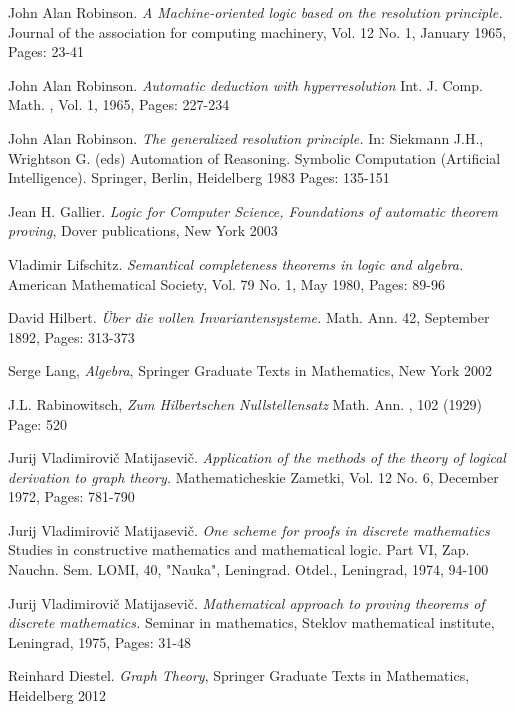 {\newpage
{}
{}
\begin{thebibliography}{9}
 
John Alan Robinson.  
\textit{A Machine-oriented logic based on the resolution principle.} 
Journal of the association for computing machinery, Vol. 12 No. 1, January 1965, Pages: 23-41

John Alan Robinson.  
\textit{Automatic deduction with hyperresolution} 
Int. J. Comp. Math. , Vol. 1, 1965, Pages: 227-234
 
John Alan Robinson.  
\textit{The generalized resolution principle.} In: Siekmann J.H., Wrightson G. (eds) Automation of Reasoning. Symbolic Computation (Artificial Intelligence). Springer, Berlin, Heidelberg 1983 Pages: 135-151		

 Jean H. Gallier. \textit{Logic for Computer Science, Foundations of automatic theorem proving}, Dover publications, New York 2003

Vladimir Lifschitz.
\textit{Semantical completeness theorems in logic and algebra.} 
American Mathematical Society, Vol. 79 No. 1, May 1980, Pages: 89-96 

David Hilbert. \textit{\"Uber die vollen Invariantensysteme.} Math. Ann. 42, September 1892, Pages: 313-373

Serge Lang, \textit{Algebra}, Springer Graduate Texts in Mathematics, New York 2002


J.L. Rabinowitsch, \textit{Zum Hilbertschen Nullstellensatz} Math. Ann. , 102 (1929) Page: 520
 
Jurij Vladimirovi\v{c} Matijasevi\v{c}.
\textit{Application of the methods of the theory of logical derivation to graph theory.} Mathematicheskie Zametki, Vol. 12 No. 6, December 1972, Pages: 781-790

Jurij Vladimirovi\v{c} Matijasevi\v{c}.
\textit{One scheme for proofs in discrete mathematics} Studies in constructive mathematics and mathematical logic. Part VI, Zap. Nauchn. Sem. LOMI, 40, "Nauka", Leningrad. Otdel., Leningrad, 1974, 94-100 

Jurij Vladimirovi\v{c} Matijasevi\v{c}.
\textit{Mathematical approach to proving theorems of discrete mathematics.} 
Seminar in mathematics, Steklov mathematical institute, Leningrad, 1975, Pages: 31-48

 Reinhard Diestel. \textit{Graph Theory}, Springer Graduate Texts in Mathematics, Heidelberg 2012




\end{thebibliography}}
